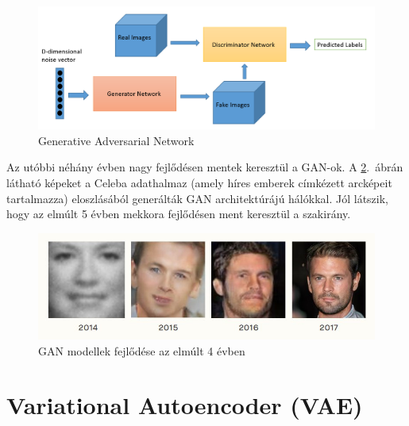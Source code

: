 \begin{figure}[h!]
\begin{center}
 
  
	\begin{center}
	\includegraphics[width=\linewidth]{gan.png}
	\end{center}
	
  \caption{Generative Adversarial Network} \label{gan}
\end{center}
\end{figure}

Az utóbbi néhány évben nagy fejlődésen mentek keresztül a GAN-ok. A \ref{gan_progress}.~ábrán látható képeket a Celeba adathalmaz (amely híres emberek címkézett arcképeit tartalmazza) eloszlásából generálták GAN architektúrájú hálókkal. Jól látszik, hogy az elmúlt 5 évben mekkora fejlődésen ment keresztül a szakirány. 

\begin{figure}[h!]
\begin{center}
  
  
	\begin{center}
	\includegraphics[width=\linewidth]{gan_progress.jpg}
	\end{center}
	
  \caption{GAN modellek fejlődése az elmúlt 4 évben}\label{gan_progress}
\end{center}
\end{figure}

\section{Variational Autoencoder (VAE)}

